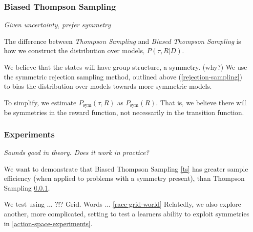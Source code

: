 \subsubsection{Biased Thompson Sampling}\label{bts}

\begin{displayquote}
\textsl{Given uncertainty, prefer symmetry}
\end{displayquote}

The difference between \textit{Thompson Sampling} and \textit{Biased Thompson Sampling}
is how we construct the distribution over models, $P(\tau, R |D)$.

We believe that the states will have group structure, a symmetry. ({\color{red}why?})
We use the symmetric rejection sampling method, outlined above (\ref{rejection-sampling}) to bias the
distribution over models towards more symmetric models.

To simplify, we estimate $P_{\text{sym}}(\tau, R)$ as $P_{\text{sym}}(R)$. That is, we believe there will be symmetries in the reward function, not necessarily in the transition function.

%
%

\subsubsection{Experiments}

\begin{displayquote}
	\textsl{Sounds good in theory. Does it work in practice?}
\end{displayquote}

We want to demonstrate that Biased Thompson Sampling \ref{ts} has greater sample efficiency (when applied to problems with a symmetry present), than Thompson Sampling \ref{bts}.

We test using ... ?!? Grid. Words ... \ref{race-grid-world}
Relatedly, we also explore another, more complicated, setting to test a learners ability to exploit symmetries in \ref{action-space-experiments}.

